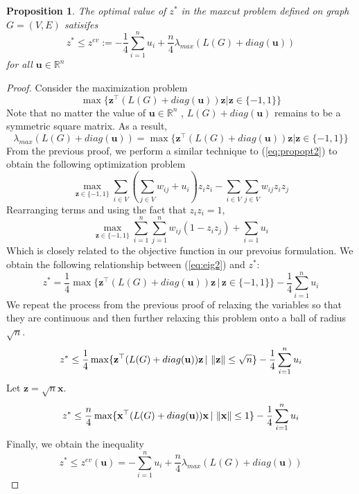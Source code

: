 \documentclass[12pt]{article}
\theoremstyle{plain}
\newtheorem{prop}{Proposition}
\theoremstyle{definition}
\begin{document}
\begin{prop}
    The optimal value of $z^*$ in the maxcut problem defined on graph $G=(V,E)$ satisifes
    \[
        z^* \leq z^{ev} := - \frac{1}{4}\sum_{i=1}^n u_i + \dfrac{n}{4} \lambda_{max}(L(G) + diag(\mathbf{u}))
    \]
    for all $\mathbf{u} \in \mathbb{R}^n$
\end{prop}

\begin{proof}
    Consider the maximization problem
    \begin{equation}\label{eq:propopt2}
        \max\lbrace \mathbf{z}^\top (L(G) + diag(\mathbf{u})) \mathbf{z} | \mathbf{z} \in \lbrace -1,1\rbrace \rbrace
    \end{equation}
    Note that no matter the value of $\mathbf{u} \in \mathbb{R}^n$ , $L(G) + diag(\mathbf{u})$ remains to be a symmetric square matrix. As a result,
    \[
        \lambda_{max}(L(G) + diag(\mathbf{u})) = \max\lbrace \mathbf{z}^\top (L(G) + diag(\mathbf{u})) \mathbf{z} | \mathbf{z} \in \lbrace -1,1\rbrace \rbrace 
    \]
    From the previous proof, we perform a similar technique to (\ref{eq:propopt2}) to obtain the following optimization problem 
    \[
    \max_{\mathbf{z} \in \lbrace -1,1 \rbrace} \sum_{i \in V}\left(\sum_{j \in V} w_{ij} + u_i \right) z_i z_i - \sum_{i \in V}\sum_{j \in V} w_{ij}z_i z_j
    \] 
    Rearranging terms and using the fact that $z_i z_i = 1$,
    \begin{equation}
        \max_{\mathbf{z} \in \lbrace -1, 1\rbrace} \sum_{i = 1}^n \sum_{j=1}^n w_{ij} (1 - z_i z_j) + \sum_{i = 1} u_i \label{eq:eig2}
    \end{equation}
    Which is closely related to the objective function in our prevoius formulation. We obtain the following relationship between (\ref{eq:eig2}) and $z^*$:
    \[
      z^* = \frac{1}{4} \max\lbrace \mathbf{z}^\top (L(G) + diag(\mathbf{u})) \mathbf{z} \,|\, \mathbf{z} \in \lbrace -1,1\rbrace \rbrace - \frac{1}{4}\sum_{i=1}^n u_i   
    \]
    We repeat the process from the previous proof of relaxing the variables so that they are continuous and then further relaxing this problem onto a ball of radius $\sqrt{n}$.
    \[
        z^* \leq \frac{1}{4} \max\lbrace \mathbf{z}^\top (L(G) + diag(\mathbf{u})) \mathbf{z} \,|\, \left\lVert\mathbf{z}\right\rVert \leq \sqrt{n} \rbrace - \frac{1}{4}\sum_{i=1}^n u_i
    \]
    Let $\mathbf{z} = \sqrt{n} \mathbf{x}$. 
    \[
        z^* \leq \frac{n}{4} \max\lbrace \mathbf{x}^\top (L(G) + diag(\mathbf{u})) \mathbf{x} \,|\, \left\lVert\mathbf{x}\right\rVert \leq 1\rbrace - \frac{1}{4}\sum_{i=1}^n u_i
    \]
    Finally, we obtain the inequality
    \begin{equation}
        z^* \leq z^{ev}(\mathbf{u}) = -\sum_{i=1}^n u_i + \dfrac{n}{4} \lambda_{max}(L(G) + diag(\mathbf{u}))
    \end{equation}
\end{proof}
\end{document}
